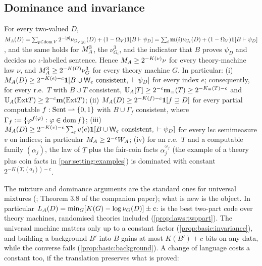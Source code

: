 \subsection{Dominance and invariance}\label{sec:basic:dominance}

\begin{theorem}\label{thm:basic:dominance}
For every two-valued $D$, $M_{A}(D)=\sum_{p\in\operatorname{dom} V}2^{-\lvert p\rvert}\nu_{G_{V(p)}}(D)+(1-\Omega_V)\mathbf{1}[B\vdash\psi_D]=\sum_i\mathbf{m}(i)\nu_{G_i}(D)+(1-\Omega_V)\mathbf{1}[B\vdash\psi_D]$, and the same holds for $M_{A}^{3}$, the $\nu^3_{G_i}$, and the indicator that $B$ proves $\psi_D$ and decides no $\iota$-labelled sentence. Hence $M_{A}\ge2^{-K(\nu)}\nu$ for every theory-machine law $\nu$, and $M_{A}^{3}\ge2^{-K(G)}\nu^3_G$ for every theory machine $G$. In particular:
(i) $M_{A}(D)\ge2^{-K(e)-c}\mathbf{1}[B\cup\mathsf{W}_{e}\text{ consistent},\ \vdash\psi_D]$ for every index $e$; consequently, for every r.e.\ $T$ with $B\cup T$ consistent, $\mathbb{U}_{A}[T]\ge2^{-c}\mathbf{m}_{\equiv}(T)\ge2^{-K_{\equiv}(T)-c}$ and $\mathbb{U}_{A}(\mathrm{Ext} T)\ge2^{-c}\mathbf{m}(\mathrm{Ext} T)$;
(ii) $M_{A}(D)\ge2^{-K(f)-c}\mathbf{1}[f\supseteq D]$ for every partial computable $f:\mathrm{Sent}\rightharpoonup\{0,1\}$ with $B\cup\Gamma_f$ consistent, where $\Gamma_f:=\{\varphi^{f(\varphi)}:\varphi\in\operatorname{dom} f\}$;
(iii) $M_{A}(D)\ge2^{-K(v)-c}\sum_ev(e)\mathbf{1}[B\cup\mathsf{W}_{e}\text{ consistent},\ \vdash\psi_D]$ for every lsc semimeasure $v$ on indices; in particular $M_{A}\ge2^{-c}W_{A}$;
(iv) for an r.e.\ $T$ and a computable family $(\alpha_j)$, the law of $T$ plus the fair-coin facts $\alpha_j^{\omega_j}$ (the example of a theory plus coin facts in \cref{par:setting:examples}) is dominated with constant $2^{-K(T,(\alpha_j))-c}$.
\end{theorem}

The mixture and dominance arguments are the standard ones for universal mixtures (\citealp{zvonkin1970complexity}; Theorem 3.8 of the companion paper); what is new is the object. In particular $L_{A}(D)=\min_G[K(G)-\log\nu_G(D)]\pm c$: \SAIabbr is the best two-part code over theory machines, randomised theories included (\cref{prop:laws:twopart}). The universal machine matters only up to a constant factor (\cref{prop:basic:invariance}), and building a background $B'$ into $B$ gains at most $K(B')+c$ bits on any data, while the converse fails (\cref{prop:basic:background}). A change of language costs a constant too, if the translation preserves what is proved:

